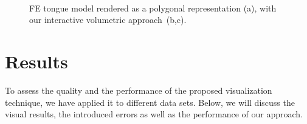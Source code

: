 \documentclass[journal]{vgtc}                %
\begin{document}
\begin{figure}
    \centering 
    \\
    \caption{FE tongue model rendered as a polygonal representation (a), with our interactive volumetric approach~(b,c).}
    \label{fig:tongue}
\end{figure}

\section{Results}\label{sec:results}

To assess the quality and the performance of the proposed visualization technique, we have applied it to different data sets. Below, we will discuss the visual results, the introduced errors as well as the performance of our approach.
\end{document}
